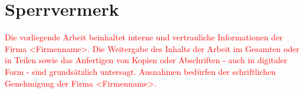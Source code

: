 \section*{Sperrvermerk}
\textcolor{red}{
Die vorliegende Arbeit beinhaltet interne und vertrauliche Informationen der Firma <Firmenname>.
Die Weitergabe des Inhalts der Arbeit im Gesamten oder in Teilen sowie das Anfertigen
von Kopien oder Abschriften - auch in digitaler Form - sind grundsätzlich untersagt.
Ausnahmen bedürfen der schriftlichen Genehmigung der Firma <Firmenname>.
}